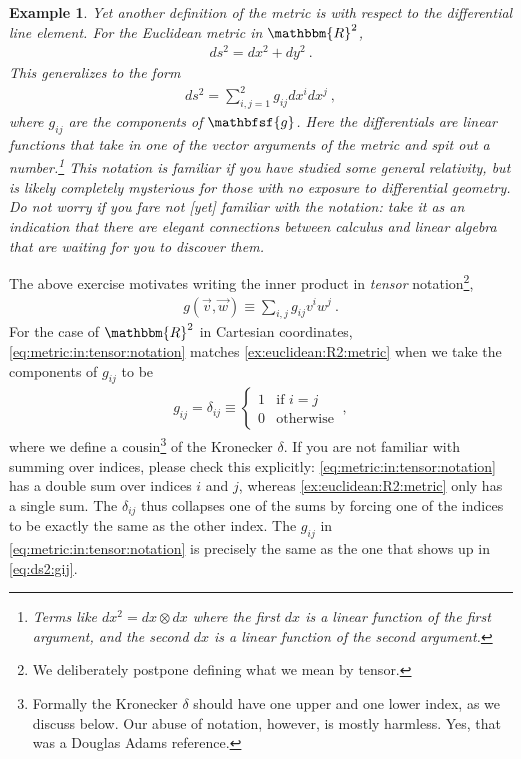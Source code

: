 \documentclass[
  11pt,
	colorful,
	raggedright,
]{tufte-style-thesis-flip}
\newtheorem{example}{Example}[section]
\newcommand{\tens}[1]{\mathbfsf{#1}}
\begin{document}
\begin{example}
Yet another definition of the metric is with respect to the differential line element. For the Euclidean metric in $\mathbbm{R}^2$,
\begin{align}
  ds^2 = dx^2 + dy^2 \ .
\end{align}
This generalizes to the form
\begin{align}
  ds^2 = \sum_{i,j=1}^2 g_{ij} dx^i dx^j \ ,
  \label{eq:ds2:gij}
\end{align}
where $g_{ij}$ are the components of $\tens{g}$. Here the differentials are linear functions that take in one of the vector arguments of the metric and spit out a number.\footnote{Terms like $dx^2 = dx\otimes dx$ where the first $dx$ is a linear function of the first argument, and the second $dx$ is a linear function of the second argument.} This notation is familiar if you have studied some general relativity, but is likely completely mysterious for those with no exposure to differential geometry. Do not worry if you fare not [yet] familiar with the notation: take it as an indication that there are elegant connections between calculus and linear algebra that are waiting for you to discover them.
\end{example}

The above exercise motivates writing the inner product in \emph{tensor} notation\footnote{We deliberately postpone defining what we mean by tensor.},
\begin{align}
  g(\vec v, \vec w) \equiv \sum_{i,j} g_{ij} v^i w^j \ .
  \label{eq:metric:in:tensor:notation}
\end{align}
For the case of $\mathbbm{R}^2$ in Cartesian coordinates, \eqref{eq:metric:in:tensor:notation} matches \eqref{ex:euclidean:R2:metric} when we take the components of $g_{ij}$ to be 
\begin{align}
 g_{ij} = \delta_{ij} 
  \equiv
  \begin{cases}
  1 & \text{if } i=j \\
  0 & \text{otherwise}
  \end{cases} \ ,
\end{align}
where we define a cousin\footnote{Formally the Kronecker $\delta$ should have one upper and one lower index, as we discuss below. Our abuse of notation, however, is mostly harmless. Yes, that was a Douglas Adams reference.} of the Kronecker $\delta$.  If you are not familiar with summing over indices, please check this explicitly: \eqref{eq:metric:in:tensor:notation} has a double sum over indices $i$ and $j$, whereas \eqref{ex:euclidean:R2:metric} only has a single sum. The $\delta_{ij}$ thus collapses one of the sums by forcing one of the indices to be exactly the same as the other index. The $g_{ij}$ in \eqref{eq:metric:in:tensor:notation} is precisely the same as the one that shows up in \eqref{eq:ds2:gij}.
\end{document}
